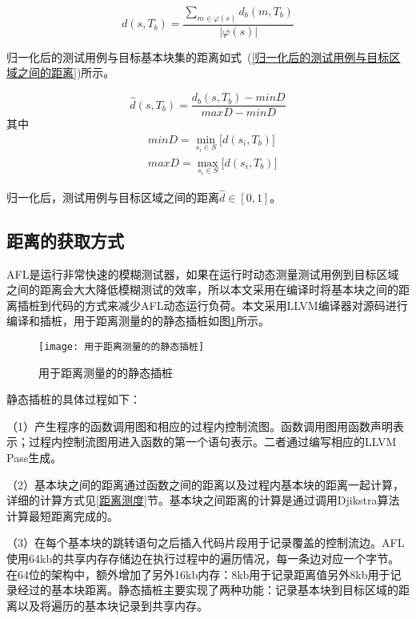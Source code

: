 \begin{equation}\label{测试用例与目标区域之间的距离}
d(s,T_b) = \frac{\sum_{m \in \varphi(s)} d_{b}(m,T_b) }{|\varphi(s)|}
\end{equation}

归一化后的测试用例与目标基本块集的距离如式~(\ref{归一化后的测试用例与目标区域之间的距离})所示。

\begin{equation}\label{归一化后的测试用例与目标区域之间的距离}
\hat{d}(s,T_b) = \frac{d_{b}(s,T_b)-minD }{maxD-minD}
\end{equation}
其中
\begin{equation}\label{minD和maxD的定义}
\begin{aligned}
& minD = \min\limits_{s_{i} \in S}\lbrack d(s_{i}, T_b) \rbrack \\
& maxD = \max\limits_{s_{i} \in S}\lbrack d(s_{i}, T_b) \rbrack
\end{aligned}
\end{equation}

归一化后，测试用例与目标区域之间的距离$\hat{d} \in [0,1]$。

\subsection{距离的获取方式}
AFL是运行非常快速的模糊测试器，如果在运行时动态测量测试用例到目标区域之间的距离会大大降低模糊测试的效率，所以本文采用在编译时将基本块之间的距离插桩到代码的方式来减少AFL动态运行负荷。本文采用LLVM编译器对源码进行编译和插桩，用于距离测量的的静态插桩如图\ref{用于距离测量的的静态插桩}所示。

\begin{figure}[htb]
\begin{center}
\texttt{[image: 用于距离测量的的静态插桩]}
\end{center}
\caption{用于距离测量的的静态插桩}
\label{用于距离测量的的静态插桩}
\end{figure}

静态插桩的具体过程如下：

（1）产生程序的函数调用图和相应的过程内控制流图。函数调用图用函数声明表示；过程内控制流图用进入函数的第一个语句表示。二者通过编写相应的LLVM Pass生成。

（2）基本块之间的距离通过函数之间的距离以及过程内基本块的距离一起计算，详细的计算方式见\ref{距离测度}节。基本块之间距离的计算是通过调用Djikstra算法计算最短距离完成的。

（3）在每个基本块的跳转语句之后插入代码片段用于记录覆盖的控制流边。AFL使用64kb的共享内存存储边在执行过程中的遍历情况，每一条边对应一个字节。在64位的架构中，额外增加了另外16kb内存：8kb用于记录距离值另外8kb用于记录经过的基本块距离。静态插桩主要实现了两种功能：记录基本块到目标区域的距离以及将遍历的基本块记录到共享内存。

